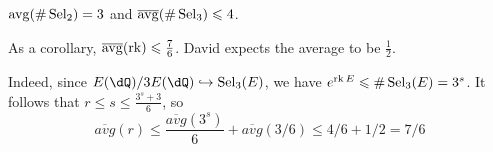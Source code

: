 \begin{theorem}
$\operatorname{avg}(\# \operatorname{Sel}_2) = 3$ and 
$\overline{\operatorname{avg}}(\# \operatorname{Sel}_3) \leqslant 4$. 
\end{theorem}

As a corollary, $\overline{\operatorname{avg}}(\operatorname{rk}) \leqslant \frac 7 6$. 
David expects the average to be $\frac 1 2$. 

Indeed, since $E(\dQ)/ 3E(\dQ)\hookrightarrow \selmer_3 (E)$, we have 
$e^{\operatorname{rk} E}\leqslant \#\operatorname{Sel}_3(E)=3^s$. It follows that 
$r\leqslant s\leqslant \frac{3^s+3}{6}$, so 
\[
  \overline{avg}(r) \leqslant \frac{\overline{avg}(3^s) }{6} + \overline{avg}(3/6) \leqslant 4/6+1/2=7/6
\]

